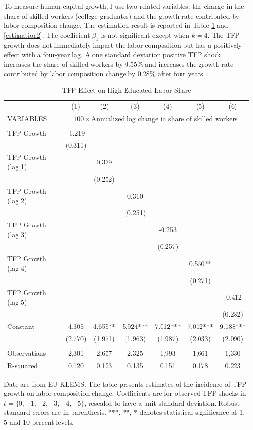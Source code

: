 \documentclass[12pt]{article}
\begin{document}
To measure human capital growth, I use two related variables: the change in the share of skilled workers (college graduates) and the growth rate contributed by labor composition change. The estimation result is reported in Table \ref{estimation1} and \ref{estimation2}. The coefficient $\beta_{1}$ is not significant except when $k=4$. The TFP growth does not immediately impact the labor composition but has a positively effect with a four-year lag. A one standard deviation positive TFP shock increases the share of skilled workers by 0.55\% and increases the growth rate contributed by labor composition change by 0.28\% after four years. 

\begin{table}[h!]
\begin{center}
\scriptsize
\begin{tabular}{lcccccc} \hline \hline
 & (1) & (2) & (3) & (4) & (5) & (6)\\
VARIABLES & \multicolumn{6}{c}{$100 \times$Annualized log change in share of skilled workers} \\ \hline
 &  &  &  &  &  &  \\
TFP Growth & -0.219 &  &  &  &  &  \\
 & (0.311) &  &  &  &  &  \\
TFP Growth (lag 1) &  & 0.339 &  &  &  &  \\
 &  & (0.252) &  &  &  &  \\
TFP Growth (lag 2) &  &  & 0.310 &  &  &  \\
 &  &  & (0.251) &  &  &  \\
TFP Growth (lag 3) &  &  &  & -0.253 &  &  \\
 &  &  &  & (0.257) &  &  \\
TFP Growth (lag 4) &  &  &  &  & 0.550** &  \\
 &  &  &  &  & (0.271) &  \\
TFP Growth (lag 5) &  &  &  &  &  & -0.412 \\
 &  &  &  &  &  & (0.282) \\
Constant & 4.305 & 4.655** & 5.924*** & 7.012*** & 7.012*** & 9.188*** \\
 & (2.770) & (1.971) & (1.963) & (1.987) & (2.033) & (2.090) \\
 &  &  &  &  &  &  \\
Observations & 2,301 & 2,657 & 2,325 & 1,993 & 1,661 & 1,330 \\
 R-squared & 0.120 & 0.123 & 0.135 & 0.151 & 0.178 & 0.223 \\ \hline
\end{tabular}
\end{center}
\caption{TFP Effect on High Educated Labor Share}
\label{estimation1}
{\scriptsize Date are from EU KLEMS. The table presents estimates of the incidence of TFP growth on labor composition change. Coefficients are for observed TFP shocks in $t = \{0,-1,-2,-3,-4,-5\}$, rescaled to have a unit standard deviation. Robust standard errors are in parenthesis. ***, **, * denotes statistical significance at 1, 5 and 10 percent levels.}
\end{table}
\end{document}
